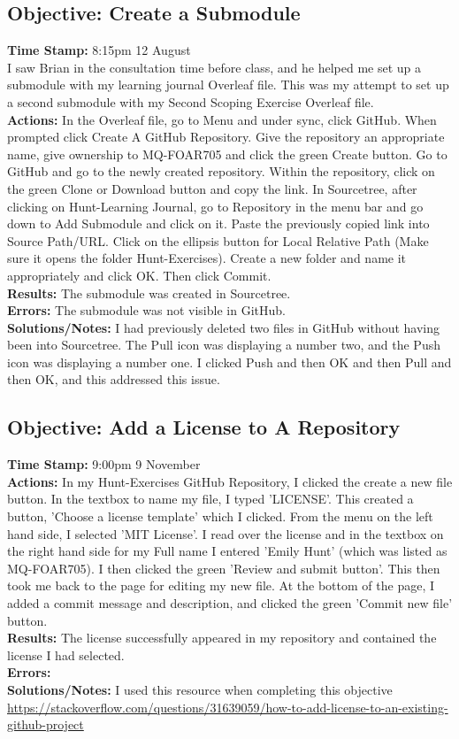 \documentclass{article}
\begin{document}
\begin{FlushLeft}
\subsection{Objective: Create a Submodule}\label{sec:submodule}
\textbf{Time Stamp:} 8:15pm 12 August\\
I saw Brian in the consultation time before class, and he helped me set up a submodule with my learning journal Overleaf file. This was my attempt to set up a second submodule with my Second Scoping Exercise Overleaf file.\\
\textbf{Actions:} In the Overleaf file, go to Menu and under sync, click GitHub. When prompted click Create A GitHub Repository. Give the repository an appropriate name, give ownership to MQ-FOAR705 and click the green Create button. Go to GitHub and go to the newly created repository. Within the repository, click on the green Clone or Download button and copy the link. In Sourcetree, after clicking on Hunt-Learning Journal, go to Repository in the menu bar and go down to Add Submodule and click on it. Paste the previously copied link into Source Path/URL. Click on the ellipsis button for Local Relative Path (Make sure it opens the folder Hunt-Exercises). Create a new folder and name it appropriately and click OK. Then click Commit.\\
\textbf{Results:} The submodule was created in Sourcetree.\\
\textbf{Errors:} The submodule was not visible in GitHub.\\
\textbf{Solutions/Notes:} I had previously deleted two files in GitHub without having been into Sourcetree. The Pull icon was displaying a number two, and the Push icon was displaying a number one. I clicked Push and then OK and then Pull and then OK, and this addressed this issue.

\subsection{Objective: Add a License to A Repository}
\textbf{Time Stamp:} 9:00pm 9 November\\
\textbf{Actions:} In my Hunt-Exercises GitHub Repository, I clicked the create a new file button. In the textbox to name my file, I typed 'LICENSE'. This created a button, 'Choose a license template' which I clicked. From the menu on the left hand side, I selected 'MIT License'. I read over the license and in the textbox on the right hand side for my Full name I entered 'Emily Hunt' (which was listed as MQ-FOAR705). I then clicked the green 'Review and submit button'. This then took me back to the page for editing my new file. At the bottom of the page, I added a commit message and description, and clicked the green 'Commit new file' button.\\
\textbf{Results:} The license successfully appeared in my repository and contained the license I had selected.\\
\textbf{Errors:} \\
\textbf{Solutions/Notes:} I used this resource when completing this objective \\\url{https://stackoverflow.com/questions/31639059/how-to-add-license-to-an-existing-github-project}



\end{FlushLeft}
\end{document}
